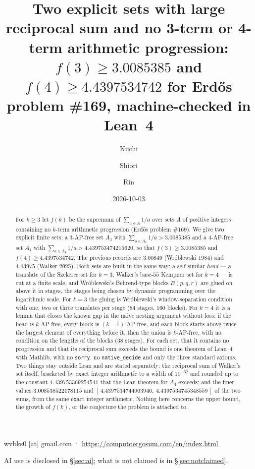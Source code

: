 \documentclass[11pt,a4paper]{article}
\title{Two explicit sets with large reciprocal sum and no 3-term or 4-term arithmetic progression:\\[4pt]
\large $f(3) \ge 3.0085385$ and $f(4) \ge 4.4397534742$ for Erd\H{o}s problem \#169, machine-checked in Lean~4}
\author{Kiichi \and Shiori \and Rin}
\date{2026-10-03}
\theoremstyle{definition}
\theoremstyle{remark}
\newcommand{\Blk}{B}
\newcommand{\code}[1]{\texttt{#1}}
\begin{document}
\maketitle
\begin{center}\small wvbks0 [at] gmail.com · \url{https://computoergosum.com/en/index.html}\end{center}
\begin{center}\small AI use is disclosed in \S\ref{sec:ai}; what is not claimed is in \S\ref{sec:notclaimed}.\end{center}

\begin{abstract}
For $k \ge 3$ let $f(k)$ be the supremum of $\sum_{a\in A} 1/a$ over sets $A$ of positive integers containing no $k$-term arithmetic progression (Erd\H{o}s problem \#169). We give two explicit finite sets: a 3-AP-free set $A_3$ with $\sum_{a\in A_3} 1/a > 3.0085385$ and a 4-AP-free set $A_4$ with $\sum_{a\in A_4} 1/a > 4.439753474215620$, so that $f(3) \ge 3.0085385$ and $f(4) \ge 4.4397534742$. The previous records are $3.00849$ (Wr\'oblewski 1984) and $4.43975$ (Walker 2025). Both sets are built in the same way: a self-similar \emph{head} --- a translate of the Szekeres set for $k=3$, Walker's base-$55$ Kempner set for $k=4$ --- is cut at a finite scale, and Wr\'oblewski's Behrend-type blocks $\Blk(p,q,r)$ are glued on above it in stages, the stages being chosen by dynamic programming over the logarithmic scale. For $k=3$ the gluing is Wr\'oblewski's window-separation condition with one, two or three translates per stage ($84$ stages, $160$ blocks). For $k=4$ it is a lemma that closes the known gap in the naive nesting argument without loss: if the head is $k$-AP-free, every block is $(k-1)$-AP-free, and each block starts above twice the largest element of everything before it, then the union is $k$-AP-free, with no condition on the lengths of the blocks ($38$ stages). For each set, that it contains no progression and that its reciprocal sum exceeds the bound is one theorem of Lean~4 with Mathlib, with no \code{sorry}, no \code{native\_decide} and only the three standard axioms. Two things stay outside Lean and are stated separately: the reciprocal sum of Walker's set itself, bracketed by exact integer arithmetic to a width of $10^{-32}$ and rounded up to the constant $4.439753369254541$ that the Lean theorem for $A_4$ exceeds; and the finer values $3.008538522178115$ and $[\,4.4397534744963946,\ 4.4397534745348559\,]$ of the two sums, from the same exact integer arithmetic. Nothing here concerns the upper bound, the growth of $f(k)$, or the conjecture the problem is attached to.
\end{abstract}
\end{document}
